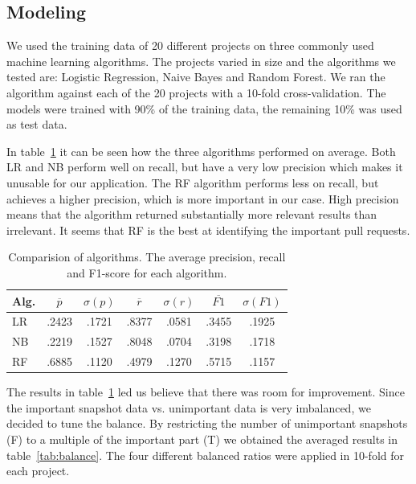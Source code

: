 \subsection{Modeling}
\label{sec:modeling}

We used the training data of 20 different projects on three commonly used machine learning algorithms.
The projects varied in size and the algorithms we tested are: Logistic Regression, Naive Bayes and Random Forest.
We ran the algorithm against each of the 20 projects with a 10-fold cross-validation.
The models were trained with 90\% of the training data, the remaining 10\% was used as test data.

In table~\ref{tab:alg-compare} it can be seen how the three algorithms performed on average.
Both LR and NB perform well on recall, but have a very low precision which makes it unusable for our application.
The RF algorithm performs less on recall, but achieves a higher precision, which is more important in our case.
High precision means that the algorithm returned substantially more relevant results than irrelevant.
It seems that RF is the best at identifying the important pull requests.

\begin{table}
  \begin{tabular}{ l | c | c | c | c | c | c }
    Alg. & $\overline{p}$ & $\sigma(p)$ & $\overline{r}$ & $\sigma(r)$ & $\overline{F1}$ & $\sigma(F1)$ \\ \hline
    \hline
    LR & .2423 & .1721 & .8377 & .0581 & .3455 & .1925 \\ \hline
    NB & .2219 & .1527 & .8048 & .0704 & .3198 & .1718 \\ \hline
    RF & .6885 & .1120 & .4979 & .1270 & .5715 & .1157 \\
  \end{tabular}
  \caption[Comparision of algorithms]{Comparision of algorithms. The average precision, recall and F1-score for each algorithm. }
  \label{tab:alg-compare}
\end{table}

The results in table~\ref{tab:alg-compare} led us believe that there was room for improvement.
Since the important snapshot data vs. unimportant data is very imbalanced, we decided to tune the balance.
By restricting the number of unimportant snapshots (F) to a multiple of the important part (T) we obtained the averaged results in table~\ref{tab:balance}.
The four different balanced ratios were applied in 10-fold for each project.

